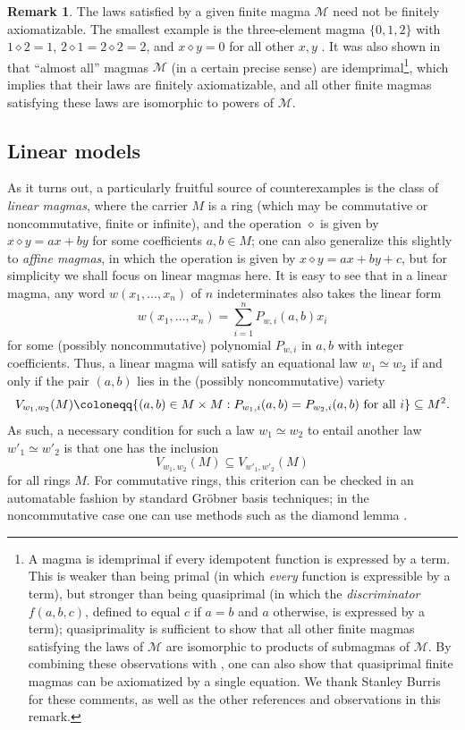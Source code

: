 \documentclass[12pt]{amsart}
\theoremstyle{definition}
\newtheorem{remark}[theorem]{Remark}
\newcommand{\op}{\diamond}
\newcommand{\formaleq}{\simeq}
\newcommand{\Magma}{{\mathcal{M}}}
\begin{document}
\begin{remark} The laws satisfied by a given finite magma $\Magma$ need not be finitely axiomatizable.  The smallest example is the three-element magma $\{0,1,2\}$ with $1 \op 2 = 1$, $2 \op 1 = 2 \op 2 = 2$, and $x \op y = 0$ for all other $x,y$ \cite{murskii-1}.  It was also shown in \cite{murskii-2} that ``almost all'' magmas $\Magma$ (in a certain precise sense) are idemprimal\footnote{A magma is idemprimal if every idempotent function is expressed by a term.  This is weaker than being primal (in which \emph{every} function is expressible by a term), but stronger than being quasiprimal (in which the \emph{discriminator} $f(a,b,c)$, defined to equal $c$ if $a=b$ and $a$ otherwise, is expressed by a term); quasiprimality is sufficient to show that all other finite magmas satisfying the laws of $\Magma$ are isomorphic to products of submagmas of $\Magma$.  By combining these observations with \cite{Padmanabhan}, one can also show that quasiprimal finite magmas can be axiomatized by a single equation.  We thank Stanley Burris for these comments, as well as the other references and observations in this remark.}, which implies that their laws are finitely axiomatizable, and all other finite magmas satisfying these laws are isomorphic to powers of $\Magma$.
\end{remark}

\subsection{Linear models}\label{linear-sec}

As it turns out, a particularly fruitful source of counterexamples is the class of \emph{linear magmas}, where the carrier $M$ is a ring (which may be commutative or noncommutative, finite or infinite), and the operation $\op$ is given by $x \op y = ax + by$ for some coefficients $a,b \in M$; one can also generalize this slightly to \emph{affine magmas}, in which the operation is given by $x \op y = ax + by + c$, but for simplicity we shall focus on linear magmas here.  It is easy to see that in a linear magma, any word $w(x_1,\dots,x_n)$ of $n$ indeterminates also takes the linear form
$$ w(x_1,\dots,x_n) = \sum_{i=1}^n P_{w,i}(a,b) x_i$$
for some (possibly noncommutative) polynomial $P_{w,i}$ in $a,b$ with integer coefficients.  Thus, a linear magma will satisfy an equational law $w_1 \formaleq w_2$ if and only if the pair $(a,b)$ lies in the (possibly noncommutative) variety
\begin{equation}\label{variety}
  V_{w_1,w_2}(M) \coloneqq \{ (a,b) \in M \times M: P_{w_1,i}(a,b) = P_{w_2,i}(a,b) \hbox{ for all } i \} \subseteq M^2.
\end{equation}
As such, a necessary condition for such a law $w_1 \formaleq w_2$ to entail another law $w'_1 \formaleq w'_2$ is that one has the inclusion
$$ V_{w_1,w_2}(M) \subseteq V_{w'_1,w'_2}(M)
$$
for all rings $M$.  For commutative rings, this criterion can be checked in an automatable fashion by standard Gr\"obner basis techniques; in the noncommutative case one can use methods such as the diamond lemma \cite{diamond-lemma}.
\end{document}
